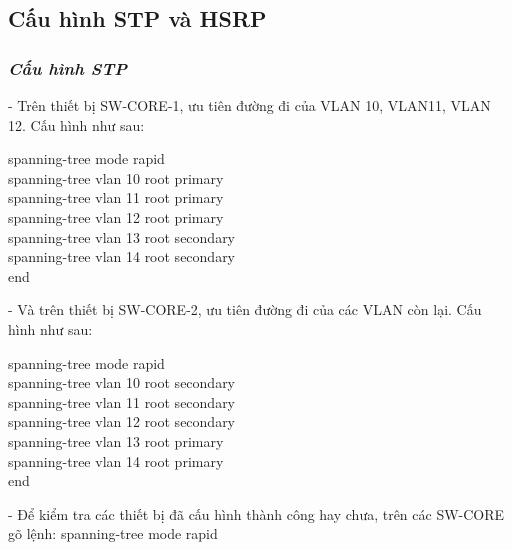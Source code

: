 \documentclass[12pt, a4paper]{article}
\begin{document}
	\newpage
	\subsection{Cấu hình STP và HSRP}
	\subsubsection{\textit{Cấu hình STP}}
	\begin{flushleft}
		- Trên thiết bị SW-CORE-1, ưu tiên đường đi của VLAN 10, VLAN11, VLAN 12. Cấu hình như sau:
		\begin{tcolorbox}
			spanning-tree mode rapid\\
			spanning-tree vlan 10 root primary\\
			spanning-tree vlan 11 root primary\\
			spanning-tree vlan 12 root primary\\
			spanning-tree vlan 13 root secondary\\
			spanning-tree vlan 14 root secondary\\
			end
		\end{tcolorbox}
		- Và trên thiết bị SW-CORE-2, ưu tiên đường đi của các VLAN còn lại. Cấu hình như sau:
		\begin{tcolorbox}
			spanning-tree mode rapid\\
			spanning-tree vlan 10 root secondary\\
			spanning-tree vlan 11 root secondary\\
			spanning-tree vlan 12 root secondary\\ 
			spanning-tree vlan 13 root primary\\ 
			spanning-tree vlan 14 root primary\\
			end
		\end{tcolorbox}
		- Để kiểm tra các thiết bị đã cấu hình thành công hay chưa, trên các SW-CORE gõ lệnh: spanning-tree mode rapid
	\end{flushleft}
	\newpage
\end{document}
